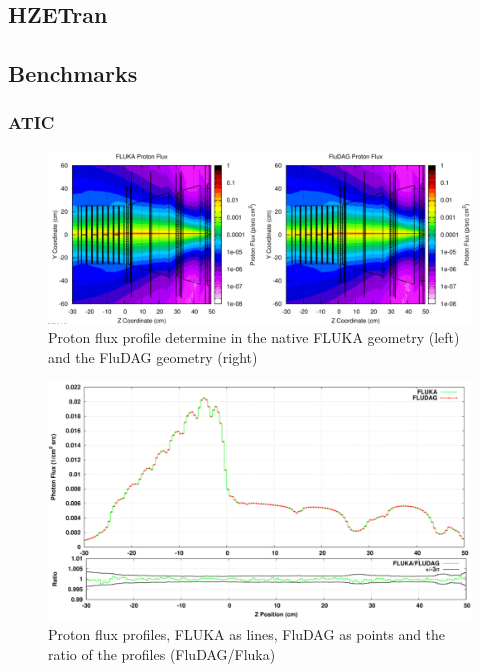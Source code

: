 \subsection{HZETran}

\clearpage
\subsection{Benchmarks}
\subsubsection{ATIC}
\clearpage
\begin{figure}[ht!]
 \begin{centering}
 \centering
 \includegraphics[width=0.7\paperwidth]{../figs/atic_proton_flux.png}
 \caption{Proton flux profile determine in the native FLUKA geometry (left) and the FluDAG geometry (right)}
 \label{fig:atic_proton_flux}
 \end{centering}
\end{figure}
\begin{figure}[ht!]
 \begin{centering}
 \centering
 \includegraphics[width=0.7\paperwidth]{../figs/atic_proton_flux_lineout.png}
 \caption{Proton flux profiles, FLUKA as lines, FluDAG as points and the ratio of the profiles (FluDAG/Fluka)}
 \label{fig:atic_proton_flux_lineout}
 \end{centering}
\end{figure}


